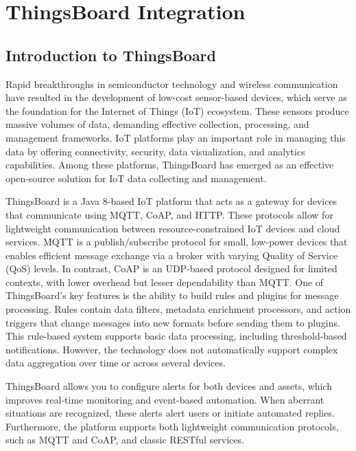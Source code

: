 \documentclass[a4paper,12pt]{report}
\begin{document}
\chapter{ThingsBoard Integration}
\section{Introduction to ThingsBoard}
Rapid breakthroughs in semiconductor technology and wireless communication have resulted in the development of low-cost sensor-based devices, which serve as the foundation for the Internet of Things (IoT) ecosystem\cite{estrin1999next}.  These sensors produce massive volumes of data, demanding effective collection, processing, and management frameworks.  IoT platforms play an important role in managing this data by offering connectivity, security, data visualization, and analytics capabilities\cite{hammi2018iot}\cite{gazis2015survey}.  Among these platforms, ThingsBoard has emerged as an effective open-source solution for IoT data collecting and management.

ThingsBoard is a Java 8-based IoT platform that acts as a gateway for devices that communicate using MQTT\cite{kegenbekov2022using}, CoAP\cite{shelby2014rfc}, and HTTP\cite{yassein2016application}.  These protocols allow for lightweight communication between resource-constrained IoT devices and cloud services.  MQTT is a publish/subscribe protocol for small, low-power devices that enables efficient message exchange via a broker with varying Quality of Service (QoS) levels\cite{kegenbekov2022using}.  In contrast, CoAP is an UDP-based protocol designed for limited contexts, with lower overhead but lesser dependability than MQTT\cite{shelby2014rfc}.
One of ThingsBoard's key features is the ability to build rules and plugins for message processing.  Rules contain data filters, metadata enrichment processors, and action triggers that change messages into new formats before sending them to plugins.  This rule-based system supports basic data processing, including threshold-based notifications.  However, the technology does not automatically support complex data aggregation over time or across several devices\cite{hammi2018iot}.

 ThingsBoard allows you to configure alerts for both devices and assets, which improves real-time monitoring and event-based automation.  When aberrant situations are recognized, these alerts alert users or initiate automated replies.  Furthermore, the platform supports both lightweight communication protocols, such as MQTT and CoAP, and classic RESTful services\cite{shelby2014rfc}. 
\end{document}
